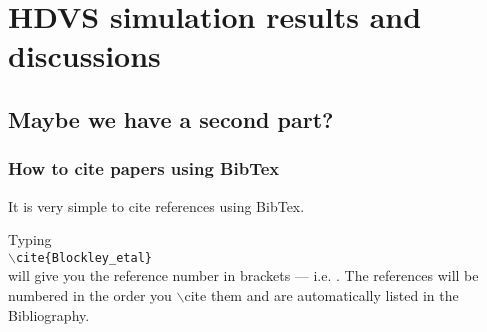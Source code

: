 \chapter{HDVS simulation results and discussions}\label{HDVS simulations}

\section{Maybe we have a second part?}



\subsection{How to cite papers using BibTex}

It is very simple to cite references using BibTex.

Typing\\ {\tt $\backslash$cite\{Blockley\_etal\}}\\ will give you the reference number in brackets --- i.e. \cite{Blockley_etal}.
The references will be numbered in the order you $\backslash$cite them and are automatically listed 	in the Bibliography.
